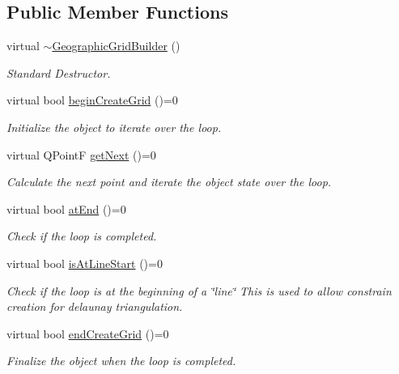 \subsection*{Public Member Functions}
\begin{DoxyCompactItemize}
\item 
virtual \mbox{\hyperlink{classdisplace_1_1graphbuilders_1_1_geographic_grid_builder_a9cdee6c4c58c6a748326da5536df34a9}{$\sim$\+Geographic\+Grid\+Builder}} ()
\begin{DoxyCompactList}\small\item\em Standard Destructor. \end{DoxyCompactList}\item 
virtual bool \mbox{\hyperlink{classdisplace_1_1graphbuilders_1_1_geographic_grid_builder_ac929320efe7bd7c38064250651263999}{begin\+Create\+Grid}} ()=0
\begin{DoxyCompactList}\small\item\em Initialize the object to iterate over the loop. \end{DoxyCompactList}\item 
virtual Q\+PointF \mbox{\hyperlink{classdisplace_1_1graphbuilders_1_1_geographic_grid_builder_a4b896b8f9e562644829df273302674b0}{get\+Next}} ()=0
\begin{DoxyCompactList}\small\item\em Calculate the next point and iterate the object state over the loop. \end{DoxyCompactList}\item 
virtual bool \mbox{\hyperlink{classdisplace_1_1graphbuilders_1_1_geographic_grid_builder_abf20b262ee44a64508458483d26f42c1}{at\+End}} ()=0
\begin{DoxyCompactList}\small\item\em Check if the loop is completed. \end{DoxyCompactList}\item 
virtual bool \mbox{\hyperlink{classdisplace_1_1graphbuilders_1_1_geographic_grid_builder_ac04ab8be97b357bb12f9745a012f6a5f}{is\+At\+Line\+Start}} ()=0
\begin{DoxyCompactList}\small\item\em Check if the loop is at the beginning of a \char`\"{}line\char`\"{} This is used to allow constrain creation for delaunay triangulation. \end{DoxyCompactList}\item 
virtual bool \mbox{\hyperlink{classdisplace_1_1graphbuilders_1_1_geographic_grid_builder_ac5f018a1c87a2e1274ff620ee7b374a6}{end\+Create\+Grid}} ()=0
\begin{DoxyCompactList}\small\item\em Finalize the object when the loop is completed. \end{DoxyCompactList}\end{DoxyCompactItemize}


